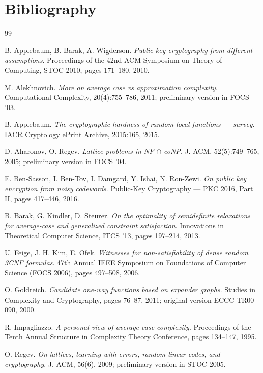 \documentclass{aicr-conjecture}
\begin{document}
\section{Bibliography}

\begin{aicrbibliography}{99}

B. Applebaum, B. Barak, A. Wigderson.
\emph{Public-key cryptography from different assumptions}.
Proceedings of the 42nd ACM Symposium on Theory of Computing, STOC
2010, pages 171--180, 2010.

M. Alekhnovich.
\emph{More on average case vs approximation complexity}.
Computational Complexity, 20(4):755--786, 2011; preliminary version in
FOCS '03.

B. Applebaum.
\emph{The cryptographic hardness of random local functions --- survey}.
IACR Cryptology ePrint Archive, 2015:165, 2015.

D. Aharonov, O. Regev.
\emph{Lattice problems in NP $\cap$ coNP}.
J. ACM, 52(5):749--765, 2005; preliminary version in FOCS '04.

E. Ben-Sasson, I. Ben-Tov, I. Damgard, Y. Ishai, N. Ron-Zewi.
\emph{On public key encryption from noisy codewords}.
Public-Key Cryptography --- PKC 2016, Part II, pages 417--446, 2016.

B. Barak, G. Kindler, D. Steurer.
\emph{On the optimality of semidefinite relaxations for average-case
and generalized constraint satisfaction}.
Innovations in Theoretical Computer Science, ITCS '13, pages 197--214,
2013.

U. Feige, J. H. Kim, E. Ofek.
\emph{Witnesses for non-satisfiability of dense random 3CNF formulas}.
47th Annual IEEE Symposium on Foundations of Computer Science (FOCS
2006), pages 497--508, 2006.

O. Goldreich.
\emph{Candidate one-way functions based on expander graphs}.
Studies in Complexity and Cryptography, pages 76--87, 2011; original
version ECCC TR00-090, 2000.

R. Impagliazzo.
\emph{A personal view of average-case complexity}.
Proceedings of the Tenth Annual Structure in Complexity Theory
Conference, pages 134--147, 1995.

O. Regev.
\emph{On lattices, learning with errors, random linear codes, and
cryptography}.
J. ACM, 56(6), 2009; preliminary version in STOC 2005.

\end{aicrbibliography}
\end{document}
